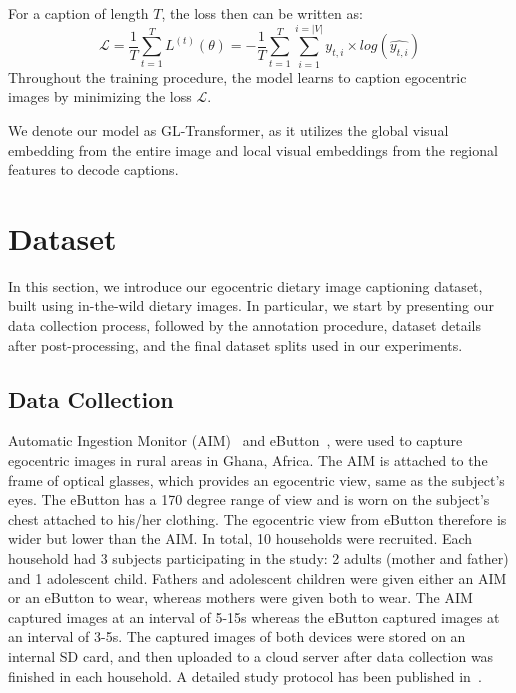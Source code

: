 \documentclass[journal]{IEEEtran}
\begin{document}
For a caption of length $T$, the loss then can be written as:
\begin{equation}
    \mathcal{L}  =  \frac{1}{T} \sum_{t=1}^{T} L^{(t)}(\theta)
                 = - \frac{1}{T} \sum_{t=1}^{T} \sum_{i=1}^{i=|V|} y_{t,i} \times log(\hat{y_{t,i}})
\end{equation}
Throughout the training procedure, the model learns to caption egocentric images by minimizing the loss $\mathcal{L}$.


We denote our model as GL-Transformer, as it utilizes the global visual embedding from the entire image and local visual embeddings from the regional features to decode captions.


















\section{Dataset}\label{sec:dataset}

In this section, we introduce our egocentric dietary image captioning dataset, built using in-the-wild dietary images. In particular, we start by presenting our data collection process, followed by the annotation procedure, dataset details after post-processing, and the final dataset splits used in our experiments.





\subsection{Data Collection}\label{subsec:data_collection}

Automatic Ingestion Monitor (AIM)~\cite{doulah2020automatic} and eButton~\cite{sun2015exploratory}, were used to capture egocentric images in rural areas in Ghana, Africa. The AIM is attached to the frame of optical glasses, which provides an egocentric view, same as the subject's eyes. The eButton has a 170 degree range of view and is worn on the subject's chest attached to his/her clothing. The egocentric view from eButton therefore is wider but lower than the AIM. In total, 10 households were recruited. Each household had 3 subjects participating in the study: 2 adults (mother and father) and 1 adolescent child. Fathers and adolescent children were given either an AIM or an eButton to wear, whereas mothers were given both to wear. The AIM captured images at an interval of 5-15s whereas the eButton captured images at an interval of 3-5s. The captured images of both devices were stored on an internal SD card, and then uploaded to a cloud server after data collection was finished in each household. A detailed study protocol has been published in~\cite{jobarteh2020development}.
\end{document}
